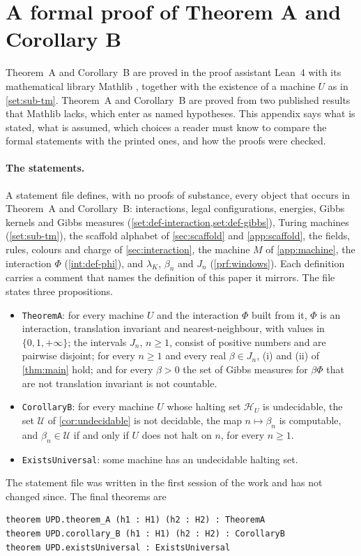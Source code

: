 \section{A formal proof of Theorem A and Corollary B}\label{app:lean}

Theorem~A and Corollary~B are proved in the proof assistant Lean~4 \cite{Lean4} with its mathematical library Mathlib \cite{Mathlib20}, together with the existence of a machine $U$ as in \cref{set:sub-tm}. Theorem~A and Corollary~B are proved from two published results that Mathlib lacks, which enter as named hypotheses. This appendix says what is stated, what is assumed, which choices a reader must know to compare the formal statements with the printed ones, and how the proofs were checked.

\paragraph{The statements.} A statement file defines, with no proofs of substance, every object that occurs in Theorem~A and Corollary~B: interactions, legal configurations, energies, Gibbs kernels and Gibbs measures (\cref{set:def-interaction,set:def-gibbs}), Turing machines (\cref{set:sub-tm}), the scaffold alphabet of \cref{sec:scaffold} and \cref{app:scaffold}, the fields, rules, colours and charge of \cref{sec:interaction}, the machine $M$ of \cref{app:machine}, the interaction $\Phi$ (\cref{int:def-phi}), and $\lambda_K$, $\beta_n$ and $J_n$ (\cref{prf:windows}). Each definition carries a comment that names the definition of this paper it mirrors. The file states three propositions.
\begin{itemize}
\item \texttt{TheoremA}: for every machine $U$ and the interaction $\Phi$ built from it, $\Phi$ is an interaction, translation invariant and nearest-neighbour, with values in $\{0,1,+\infty\}$; the intervals $J_n$, $n\ge1$, consist of positive numbers and are pairwise disjoint; for every $n\ge1$ and every real $\beta\in J_n$, (i) and (ii) of \cref{thm:main} hold; and for every $\beta>0$ the set of Gibbs measures for $\beta\Phi$ that are not translation invariant is not countable.
\item \texttt{CorollaryB}: for every machine $U$ whose halting set $\mathcal H_U$ is undecidable, the set $\mathcal U$ of \cref{cor:undecidable} is not decidable, the map $n\mapsto\beta_n$ is computable, and $\beta_n\in\mathcal U$ if and only if $U$ does not halt on $n$, for every $n\ge1$.
\item \texttt{ExistsUniversal}: some machine has an undecidable halting set.
\end{itemize}
The statement file was written in the first session of the work and has not changed since. The final theorems are
\begingroup\small
\begin{verbatim}
theorem UPD.theorem_A (h1 : H1) (h2 : H2) : TheoremA
theorem UPD.corollary_B (h1 : H1) (h2 : H2) : CorollaryB
theorem UPD.existsUniversal : ExistsUniversal
\end{verbatim}
\endgroup

